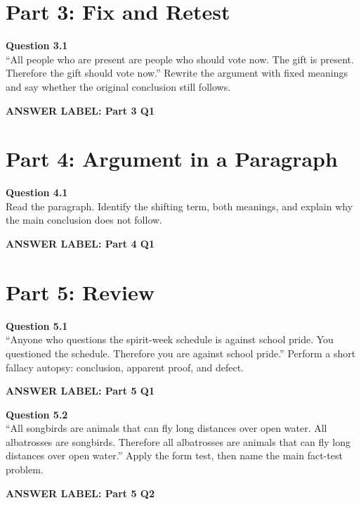 \documentclass[12pt]{article}
\newcommand{\answerbox}[2]{%
\vspace{0.15em}
\noindent\textbf{#1}\par
\vspace{0.05em}
\noindent\fbox{%
\begin{minipage}[t][#2]{\dimexpr\textwidth-2\fboxsep-2\fboxrule}
\rule{\textwidth}{0pt}
\vspace{#2}
\end{minipage}
}\par
\vspace{0.25em}
}
\begin{document}
\section*{Part 3: Fix and Retest}

\textbf{Question 3.1}\\[-0.15em]
``All people who are present are people who should vote now. The gift is present. Therefore the gift should vote now.'' Rewrite the argument with fixed meanings and say whether the original conclusion still follows.

\answerbox{ANSWER LABEL: Part 3 Q1}{2.85in}

\newpage

\section*{Part 4: Argument in a Paragraph}

\textbf{Question 4.1}\\[-0.15em]
Read the paragraph. Identify the shifting term, both meanings, and explain why the main conclusion does not follow.

\vspace{0.2em}

\noindent{}

\answerbox{ANSWER LABEL: Part 4 Q1}{2.55in}

\newpage

\section*{Part 5: Review}

\textbf{Question 5.1}\\[-0.15em]
``Anyone who questions the spirit-week schedule is against school pride. You questioned the schedule. Therefore you are against school pride.'' Perform a short fallacy autopsy: conclusion, apparent proof, and defect.

\answerbox{ANSWER LABEL: Part 5 Q1}{2.15in}

\textbf{Question 5.2}\\[-0.15em]
``All songbirds are animals that can fly long distances over open water. All albatrosses are songbirds. Therefore all albatrosses are animals that can fly long distances over open water.'' Apply the form test, then name the main fact-test problem.

\answerbox{ANSWER LABEL: Part 5 Q2}{1.85in}
\end{document}
